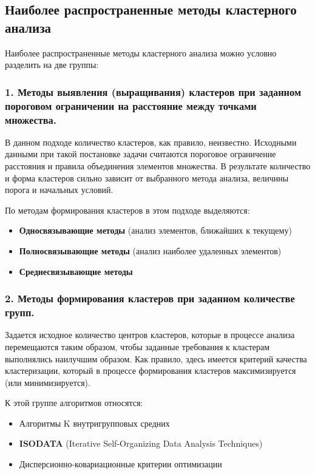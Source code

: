 \documentclass[11pt]{article}
\begin{document}
\subsection{Наиболее распространенные методы кластерного анализа}

Наиболее распространенные методы кластерного анализа можно условно разделить на две группы:

\subsubsection{1. Методы выявления (выращивания) кластеров при заданном пороговом ограничении на расстояние между точками множества.}

В данном подходе количество кластеров, как правило, неизвестно. Исходными данными при такой постановке задачи считаются пороговое ограничение расстояния и правила объединения элементов множества. В результате количество и форма кластеров сильно зависит от выбранного метода анализа, величины порога и начальных условий.

По методам формирования кластеров в этом подходе выделяются:
\begin{itemize}
    \item \textbf{Односвязывающие методы} (анализ элементов, ближайших к текущему)
    \item \textbf{Полносвязывающие методы} (анализ наиболее удаленных элементов)
    \item \textbf{Среднесвязывающие методы}
\end{itemize}

\subsubsection{2. Методы формирования кластеров при заданном количестве групп.}

Задается исходное количество центров кластеров, которые в процессе анализа перемещаются таким образом, чтобы заданные требования к кластерам выполнялись наилучшим образом. Как правило, здесь имеется критерий качества кластеризации, который в процессе формирования кластеров максимизируется (или минимизируется).

К этой группе алгоритмов относятся:
\begin{itemize}
    \item Алгоритмы K внутригрупповых средних
    \item \textbf{ISODATA} (Iterative Self-Organizing Data Analysis Techniques)
    \item Дисперсионно-ковариационные критерии оптимизации
\end{itemize}
\end{document}
